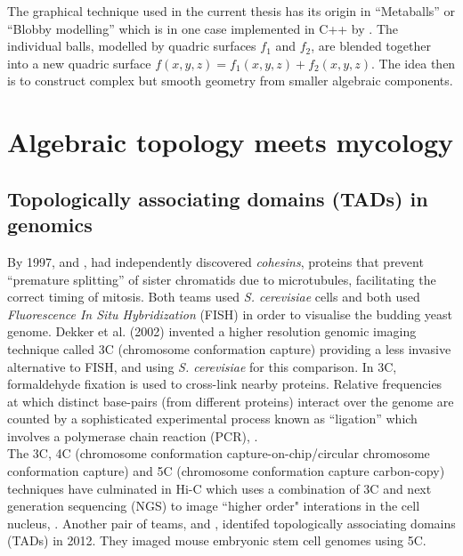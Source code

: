 The graphical technique used in the current thesis has its origin in ``Metaballs'' or 
``Blobby modelling'' which is in one case
implemented in C++ by \cite{kommareddy20143d}. The individual balls, 
modelled by quadric surfaces $f_1$ and $f_2$, are blended together 
into a new quadric surface $f(x,y,z) = f_1(x,y,z) + f_2(x,y,z)$. The idea then 
is to construct complex but smooth geometry from smaller algebraic components.
\\

\section{Algebraic topology meets mycology}

\subsection{Topologically associating domains (TADs) in genomics}

By 1997, \cite{guacci1997direct} and \cite{michaelis1997cohesins},
had independently discovered \textit{cohesins}, proteins that 
prevent ``premature splitting'' of sister chromatids due 
to microtubules, facilitating the correct timing of mitosis. 
Both teams used \textit{S. cerevisiae} cells and both
used \textit{Fluorescence In Situ Hybridization} (FISH) in order to visualise 
the budding yeast genome. Dekker et al. (2002) invented a higher 
resolution genomic imaging technique called 3C (chromosome conformation capture)
\cite{dekker2002capturing} providing a less invasive alternative 
to FISH, and using \textit{S. cerevisiae} for this comparison.
In 3C, formaldehyde fixation is used to cross-link nearby proteins.
Relative frequencies at which distinct base-pairs (from different proteins)
interact over the genome are counted by a sophisticated experimental
process known as ``ligation'' which involves a polymerase chain reaction (PCR),
\cite{dekker2002capturing}.
\\

The 3C, 4C (chromosome conformation capture-on-chip/circular chromosome conformation capture) and 5C 
(chromosome conformation capture carbon-copy) techniques have culminated in Hi-C which 
uses a combination of 3C and next generation sequencing (NGS) to image ``higher order" interations 
in the cell nucleus, \cite{nora2012spatial}. Another pair of teams, \cite{nora2012spatial} and 
\cite{dixon2012topological}, identifed topologically associating domains (TADs) in 2012. 
They imaged mouse embryonic stem cell genomes using 5C.
\\

